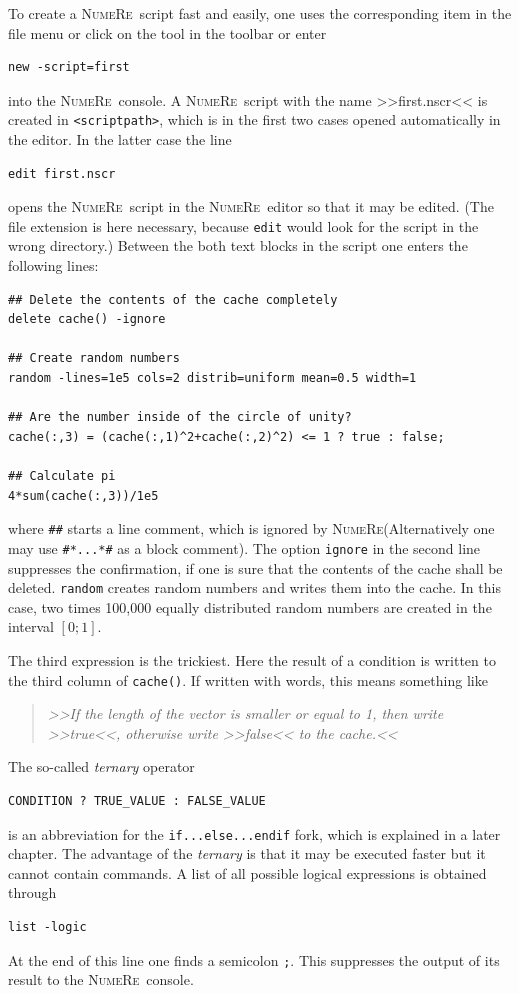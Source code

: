 \documentclass[DIV=14,headsepline,footsepline]{scrbook}
\newcommand{\NR}{\textsc{Nu\-me\-Re}}
\begin{document}
				To create a \NR\ script fast and easily, one uses the corresponding item in the file menu or click on the tool in the toolbar or enter 
				\begin{lstlisting}
new -script=first
				\end{lstlisting}
				into the \NR\ console. A \NR\ script with the name >>first.nscr<< is created in \lstinline+<scriptpath>+, which is in the first two cases opened automatically in the editor. In the latter case the line
				\begin{lstlisting}
edit first.nscr
				\end{lstlisting}
				opens the \NR\ script in the \NR\ editor so that it may be edited. (The file extension is here necessary, because \lstinline+edit+ would look for the script in the wrong directory.) Between the both text blocks in the script one enters the following lines:
				\begin{lstlisting}
## Delete the contents of the cache completely
delete cache() -ignore

## Create random numbers
random -lines=1e5 cols=2 distrib=uniform mean=0.5 width=1

## Are the number inside of the circle of unity?
cache(:,3) = (cache(:,1)^2+cache(:,2)^2) <= 1 ? true : false;

## Calculate pi
4*sum(cache(:,3))/1e5
				\end{lstlisting}
				where \lstinline+##+ starts a line comment, which is ignored by \NR (Alternatively one may use \lstinline+#*...*#+ as a block comment). The option \lstinline+ignore+ in the second line suppresses the confirmation, if one is sure that the contents of the cache shall be deleted. \lstinline+random+ creates random numbers and writes them into the cache. In this case, two times 100,000 equally distributed random numbers are created in the interval $[0;1]$.
				
				The third expression is the trickiest. Here the result of a condition is written to the third column of \lstinline+cache()+. If written with words, this means something like
				\begin{quotation}
					\noindent\emph{>>If the length of the vector is smaller or equal to 1, then write >>true<<, otherwise write >>false<< to the cache.<<}
				\end{quotation}
				The so-called \emph{ternary} operator
				\begin{lstlisting}
CONDITION ? TRUE_VALUE : FALSE_VALUE
				\end{lstlisting}
				is an abbreviation for the \lstinline+if...else...endif+ fork, which is explained in a later chapter. The advantage of the \emph{ternary} is that it may be executed faster but it cannot contain commands. A list of all possible logical expressions is obtained through
				\begin{lstlisting}
list -logic
				\end{lstlisting}
				At the end of this line one finds a semicolon \lstinline+;+. This suppresses the output of its result to the \NR\ console.
				
\end{document}
